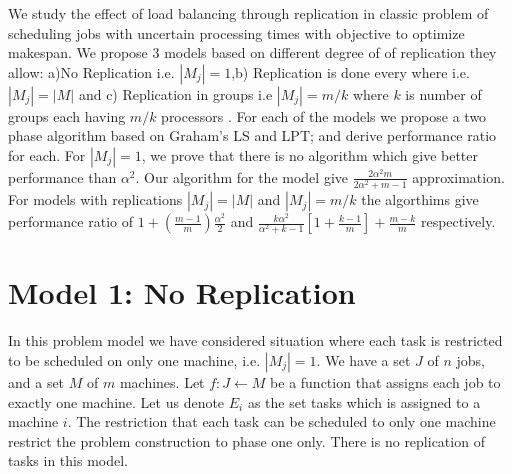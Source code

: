 \documentclass[10pt, conference, compsocconf]{IEEEtran}
\begin{document}
We study the effect of load balancing through replication in classic problem of scheduling jobs with uncertain processing times with objective to optimize makespan. We propose 3 models based on different degree of of
replication they allow: a)No Replication i.e. $|M_j|=1 $,b) Replication is done every where i.e.$|M_j|=|M|$ and c) Replication in groups i.e $|M_j|= m/k$  where $k$ is number of groups each having $m/k$ processors . For each of the models we propose a two phase algorithm based on Graham’s LS and LPT; and derive performance ratio for each. For $|M_j|=1 $, we prove that there is no algorithm which give better performance than $\alpha^2$. Our algorithm for the model give $\frac{2\alpha^{2}m}{2\alpha^{2}+ m-1}$ approximation. For models with replications $|M_j|=|M|$ and $|M_j|= m/k$ the algorthims give performance
ratio of $ 1 + (\frac{m-1}{m})\frac{\alpha^{2}}{2}$ and $\frac{k\alpha^{2}}{\alpha^{2}+k-1}\left[1+ {\frac{k-1}{m}} \right]+ {\frac{m-k}{m}}$ respectively.

\section{Model 1: No Replication} 


In this problem model we have considered  situation where each task is restricted to be scheduled on only one machine, i.e. $|M_j|=1$.  We have a set $J$ of $ n$ jobs, and a set $M$ of $m$ machines.  Let $f : J \leftarrow M$ be a function that assigns each job to exactly one machine. Let us denote $E_{i}$ as the set tasks which is assigned to a machine $i$.  The restriction that each task can be scheduled to only one machine restrict the problem construction to phase one only. There is no replication of tasks in this model.\\
\end{document}
